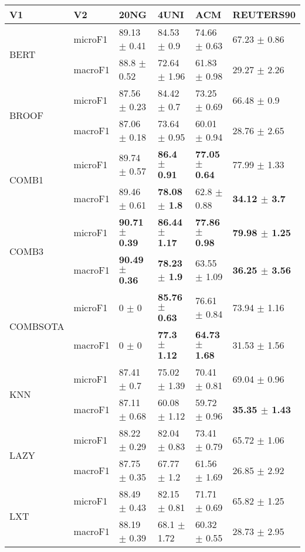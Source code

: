 \documentclass[]{article}
\begin{document}
\begin{table}[ht]
\centering
\begin{tabular}{llllll}
  \hline
V1 & V2 & 20NG & 4UNI & ACM & REUTERS90 \\ 
  \hline
\multirow{2}{*}{BERT} & microF1 & 89.13 $\pm$  0.41 & 84.53 $\pm$  0.9 & 74.66 $\pm$  0.63 & 67.23 $\pm$  0.86 \\ 
   & macroF1 & 88.8 $\pm$  0.52 & 72.64 $\pm$  1.96 & 61.83 $\pm$  0.98 & 29.27 $\pm$  2.26 \\ 
  \multirow{2}{*}{BROOF} & microF1 & 87.56 $\pm$  0.23 & 84.42 $\pm$  0.7 & 73.25 $\pm$  0.69 & 66.48 $\pm$  0.9 \\ 
   & macroF1 & 87.06 $\pm$  0.18 & 73.64 $\pm$  0.95 & 60.01 $\pm$  0.94 & 28.76 $\pm$  2.65 \\ 
  \multirow{2}{*}{COMB1} & microF1 & 89.74 $\pm$  0.57 & \bf{86.4 $\pm$  0.91} & \bf{77.05 $\pm$  0.64} & 77.99 $\pm$  1.33 \\ 
   & macroF1 & 89.46 $\pm$  0.61 & \bf{78.08 $\pm$  1.8} & 62.8 $\pm$  0.88 & \bf{34.12 $\pm$  3.7} \\ 
  \multirow{2}{*}{COMB3} & microF1 & \bf{90.71 $\pm$  0.39} & \bf{86.44 $\pm$  1.17} & \bf{77.86 $\pm$  0.98} & \bf{79.98 $\pm$  1.25} \\ 
   & macroF1 & \bf{90.49 $\pm$  0.36} & \bf{78.23 $\pm$  1.9} & 63.55 $\pm$  1.09 & \bf{36.25 $\pm$  3.56} \\ 
  \multirow{2}{*}{COMBSOTA} & microF1 & 0 $\pm$  0 & \bf{85.76 $\pm$  0.63} & 76.61 $\pm$  0.84 & 73.94 $\pm$  1.16 \\ 
   & macroF1 & 0 $\pm$  0 & \bf{77.3 $\pm$  1.12} & \bf{64.73 $\pm$  1.68} & 31.53 $\pm$  1.56 \\ 
  \multirow{2}{*}{KNN} & microF1 & 87.41 $\pm$  0.7 & 75.02 $\pm$  1.39 & 70.41 $\pm$  0.81 & 69.04 $\pm$  0.96 \\ 
   & macroF1 & 87.11 $\pm$  0.68 & 60.08 $\pm$  1.12 & 59.72 $\pm$  0.96 & \bf{35.35 $\pm$  1.43} \\ 
  \multirow{2}{*}{LAZY} & microF1 & 88.22 $\pm$  0.29 & 82.04 $\pm$  0.83 & 73.41 $\pm$  0.79 & 65.72 $\pm$  1.06 \\ 
   & macroF1 & 87.75 $\pm$  0.35 & 67.77 $\pm$  1.2 & 61.56 $\pm$  1.69 & 26.85 $\pm$  2.92 \\ 
  \multirow{2}{*}{LXT} & microF1 & 88.49 $\pm$  0.43 & 82.15 $\pm$  0.81 & 71.71 $\pm$  0.69 & 65.82 $\pm$  1.25 \\ 
   & macroF1 & 88.19 $\pm$  0.39 & 68.1 $\pm$  1.72 & 60.32 $\pm$  0.55 & 28.73 $\pm$  2.95 \\ 

\end{tabular}
\end{table}
\end{document}
